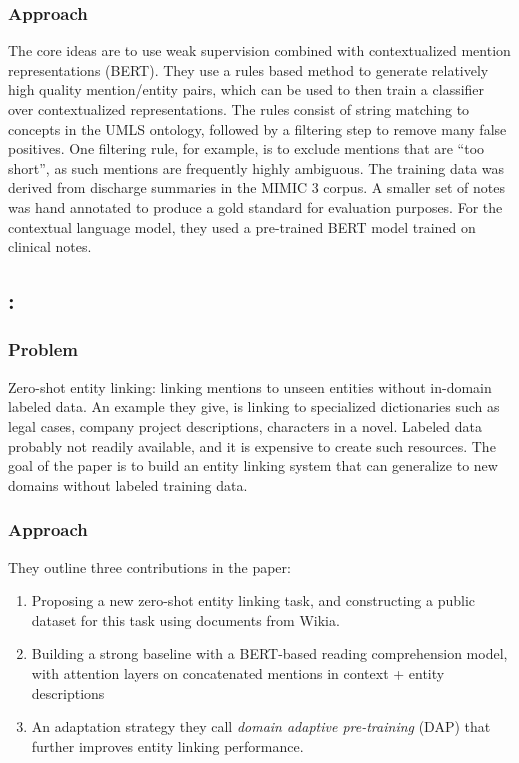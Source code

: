 \documentclass{article}
\begin{document}
\subsubsection{Approach}

The core ideas are to use weak supervision combined with contextualized mention representations (BERT). They use a rules based method to generate relatively high quality mention/entity pairs, which can be used to then train a classifier over contextualized representations. The rules consist of string matching to concepts in the UMLS ontology, followed by a filtering step to remove many false positives. One filtering rule, for example, is to exclude mentions that are ``too short'', as such mentions are frequently highly ambiguous. The training data was derived from discharge summaries in the MIMIC 3 corpus. A smaller set of notes was hand annotated to produce a gold standard for evaluation purposes. For the contextual language model, they used a pre-trained BERT model trained on clinical notes.


\subsection{\cite{logeswaran_zero-shot_2019}: }

\subsubsection{Problem}

Zero-shot entity linking: linking mentions to unseen entities without in-domain labeled data. An example they give, is linking to specialized dictionaries such as legal cases, company project descriptions, characters in a novel. Labeled data probably not readily available, and it is expensive to create such resources. The goal of the paper is to build an entity linking system that can generalize to new domains without labeled training data.

\subsubsection{Approach}

They outline three contributions in the paper:

\begin{enumerate}
\item Proposing a new zero-shot entity linking task, and constructing a public dataset for this task using documents from Wikia.
\item Building a strong baseline with a BERT-based reading comprehension model, with attention layers on concatenated mentions in context + entity descriptions
\item An adaptation strategy they call \emph{domain adaptive pre-training} (DAP) that further improves entity linking performance.
\end{enumerate}
\end{document}
